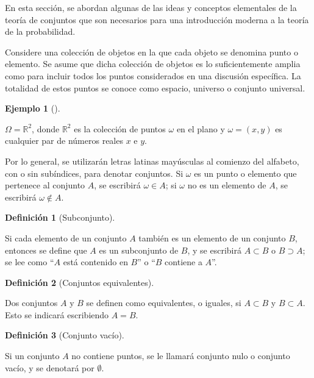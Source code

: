 \documentclass[
  letterpaper,
  DIV=11,
  numbers=noendperiod]{scrreport}
\theoremstyle{plain}
\theoremstyle{definition}
\newtheorem{definition}{Definición}[chapter]
\theoremstyle{definition}
\newtheorem{example}{Ejemplo}[chapter]
\theoremstyle{plain}
\theoremstyle{remark}
\begin{document}
En esta sección, se abordan algunas de las ideas y conceptos elementales
de la teoría de conjuntos que son necesarios para una introducción
moderna a la teoría de la probabilidad.

Considere una colección de objetos en la que cada objeto se denomina
punto o elemento. Se asume que dicha colección de objetos es lo
suficientemente amplia como para incluir todos los puntos considerados
en una discusión específica. La totalidad de estos puntos se conoce como
espacio, universo o conjunto universal.

\begin{example}[]\protect\hypertarget{exm-1}{}\label{exm-1}

\(\Omega = \mathbb{R}^2\), donde \(\mathbb{R}^2\) es la colección de
puntos \(\omega\) en el plano y \(\omega=(x,y)\) es cualquier par de
números reales \(x\) e \(y\).

\end{example}

Por lo general, se utilizarán letras latinas mayúsculas al comienzo del
alfabeto, con o sin subíndices, para denotar conjuntos. Si \(\omega\) es
un punto o elemento que pertenece al conjunto \(A\), se escribirá
\(\omega \in A\); si \(\omega\) no es un elemento de \(A\), se escribirá
\(\omega \notin A\).

\begin{definition}[Subconjunto]\protect\hypertarget{def-sub}{}\label{def-sub}

Si cada elemento de un conjunto \(A\) también es un elemento de un
conjunto \(B\), entonces se define que \(A\) es un subconjunto de \(B\),
y se escribirá \(A\subset B\) o \(B\supset A\); se lee como ``\(A\) está
contenido en \(B\)'' o ``\(B\) contiene a \(A\)''.

\end{definition}

\begin{definition}[Conjuntos
equivalentes]\protect\hypertarget{def-ce}{}\label{def-ce}

Dos conjuntos \(A\) y \(B\) se definen como equivalentes, o iguales, si
\(A\subset B\) y \(B\subset A\). Esto se indicará escribiendo \(A=B\).

\end{definition}

\begin{definition}[Conjunto
vacío]\protect\hypertarget{def-emptyset}{}\label{def-emptyset}

Si un conjunto \(A\) no contiene puntos, se le llamará conjunto nulo o
conjunto vacío, y se denotará por \(\emptyset\).

\end{definition}
\end{document}

